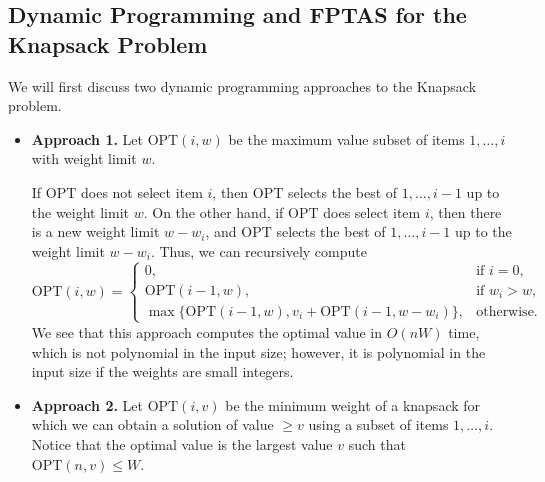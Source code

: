 \subsection{Dynamic Programming and FPTAS for the Knapsack Problem}\label{subsec:3.4}
We will first discuss two dynamic programming approaches to the 
{\sc Knapsack} problem. 
\begin{itemize}
    \item {\bf Approach 1.} Let $\text{OPT}(i, w)$ be the maximum 
    value subset of items $1, \dots, i$ with weight limit $w$. 

    If $\text{OPT}$ does not select item $i$, then $\text{OPT}$ selects 
    the best of $1, \dots, i-1$ up to the weight limit $w$. 
    On the other hand, if $\text{OPT}$ does select item $i$, then 
    there is a new weight limit $w - w_i$, and $\text{OPT}$ selects the 
    best of $1, \dots, i-1$ up to the weight limit $w - w_i$. Thus, 
    we can recursively compute 
    \[ \text{OPT}(i, w) = \begin{cases}
        0, & \text{if } i = 0, \\ 
        \text{OPT}(i-1, w), & \text{if } w_i > w, \\ 
        \max\{\text{OPT}(i-1, w), v_i + \text{OPT}(i-1, w-w_i)\}, & 
        \text{otherwise.} 
    \end{cases} \] 
    We see that this approach computes the optimal value in $O(nW)$ time, 
    which is not polynomial in the input size; however, it is polynomial 
    in the input size if the weights are small integers. 

    \item {\bf Approach 2.} Let $\text{OPT}(i, v)$ be the minimum weight 
    of a knapsack for which we can obtain a solution of value $\geq v$ 
    using a subset of items $1, \dots, i$. Notice that the optimal value 
    is the largest value $v$ such that $\text{OPT}(n, v) \leq W$. 


\end{itemize}
